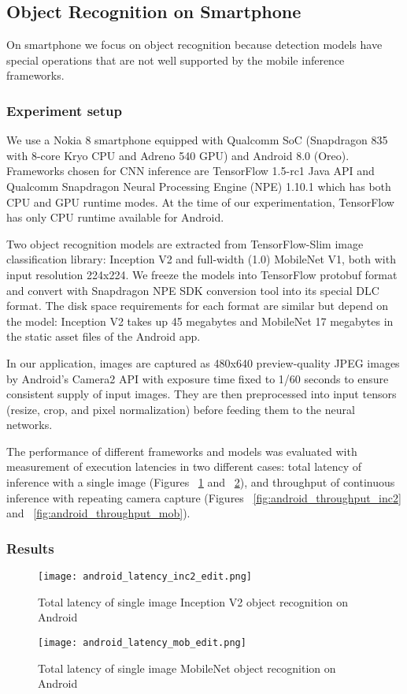 \documentclass[sigconf]{acmart}
\begin{document}
\subsection{Object Recognition on Smartphone}\label{sec:android_recognition}
On smartphone we focus on object recognition because detection models have special operations that are not well supported by the mobile inference frameworks.

\subsubsection{Experiment setup}

We use a Nokia 8 smartphone equipped with Qualcomm SoC (Snapdragon 835 with 8-core Kryo CPU and Adreno 540 GPU) and Android 8.0 (Oreo). Frameworks chosen for CNN inference are TensorFlow 1.5-rc1 Java API and Qualcomm Snapdragon Neural Processing Engine (NPE) 1.10.1 which has both CPU and GPU runtime modes. At the time of our experimentation, TensorFlow has only CPU runtime available for Android.

Two object recognition models are extracted from TensorFlow-Slim image classification library: Inception V2 and full-width (1.0) MobileNet V1, both with input resolution 224x224. We freeze the models into TensorFlow protobuf format and convert with Snapdragon NPE SDK conversion tool into its special DLC format. The disk space requirements for each format are similar but depend on the model: Inception V2 takes up 45 megabytes and MobileNet 17 megabytes in the static asset files of the Android app.

In our application, images are captured as 480x640 preview-quality JPEG images by Android's Camera2 API with exposure time fixed to 1/60 seconds to ensure consistent supply of input images. They are then preprocessed into input tensors (resize, crop, and pixel normalization) before feeding them to the neural networks.

The performance of different frameworks and models was evaluated with measurement of execution latencies in two different cases: total latency of inference with a single image (Figures ~\ref{fig:android_latency_inc2} and ~\ref{fig:android_latency_mob}), and throughput of continuous inference with repeating camera capture (Figures ~\ref{fig:android_throughput_inc2} and ~\ref{fig:android_throughput_mob}).

\subsubsection{Results}\begin{figure}[t]
\centering
\texttt{[image: android\_latency\_inc2\_edit.png]}
\caption{Total latency of single image Inception V2 object recognition on Android}
\label{fig:android_latency_inc2}
\end{figure}\begin{figure}[t]
\centering
\texttt{[image: android\_latency\_mob\_edit.png]}
\caption{Total latency of single image MobileNet object recognition on Android}
\label{fig:android_latency_mob}
\end{figure}
\end{document}
